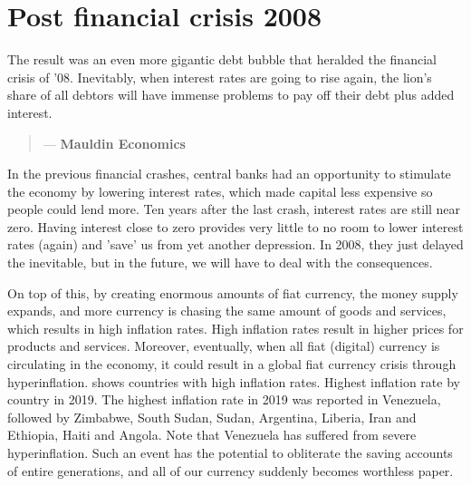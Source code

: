 \section{Post financial crisis 2008}
        
The result was an even more gigantic debt bubble that heralded the financial crisis of '08. Inevitably, when interest rates are going to rise again, the lion's share of all debtors will have immense problems to pay off their debt plus added interest.\medskip 



\begin{quotation}

      \textit{}
      \begin{flushright}
        \small{--- \textbf{Mauldin Economics}}
      \end{flushright}
    
\end{quotation}


In the previous financial crashes, central banks had an opportunity to stimulate the economy by lowering interest rates, which made capital less expensive so people could lend more. Ten years after the last crash, interest rates are still near zero. Having interest close to zero provides very little to no room to lower interest rates (again) and 'save' us from yet another depression. In 2008, they just delayed the inevitable, but in the future, we will have to deal with the consequences.\medskip

On top of this, by creating enormous amounts of fiat currency, the money supply expands, and more currency is chasing the same amount of goods and services, which results in high inflation rates. High inflation rates result in higher prices for products and services. Moreover, eventually, when all fiat (digital) currency is circulating in the economy, it could result in a global fiat currency crisis through hyperinflation.  shows countries with high inflation rates. Highest inflation rate by country in 2019. The highest inflation rate in 2019 was reported in Venezuela, followed by Zimbabwe, South Sudan, Sudan, Argentina, Liberia, Iran and Ethiopia, Haiti and Angola. Note that Venezuela has suffered from severe hyperinflation. Such an event has the potential to obliterate the saving accounts of entire generations, and all of our currency suddenly becomes worthless paper. 

